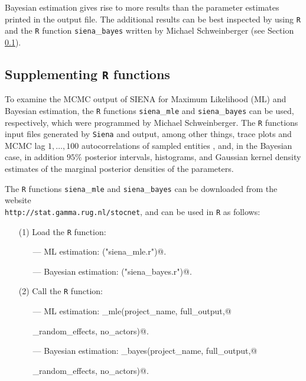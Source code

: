 \documentclass[a4paper,fleqn,11pt]{article}
\newcommand{\+}{\, + \,}
\newcommand{\SI}{{\sf SIENA }}
\begin{document}
Bayesian estimation gives rise to more results than the parameter
estimates printed in the output file.
The additional results can be best inspected by using {\tt R} and the
{\tt R} function {\tt siena}\_{\tt bayes} written by Michael
Schweinberger (see Section \ref{R_functions}).

\subsection{Supplementing {\tt R} functions}
\label{R_functions}

To examine the MCMC output of \SI for Maximum Likelihood (ML) and Bayesian estimation,
the {\tt R} functions {\tt siena}\_{\tt mle} and {\tt siena}\_{\tt bayes} can be used,
respectively,
which were programmed by Michael Schweinberger.
The {\tt R} functions input files generated by {\tt Siena} and output,
among other things,
trace plots and MCMC lag $1, \dots, 100$ autocorrelations of sampled entities
\citep[see][]{SchweinbergerSnijders07b, SchweinbergerSnijders07c},
and,
in the Bayesian case,
in addition $95\%$ posterior intervals, histograms, and Gaussian kernel density
estimates of the marginal posterior densities of the parameters.

The {\tt R} functions {\tt siena}\_{\tt mle} and {\tt siena}\_{\tt bayes}
can be downloaded from the website \\
{\tt http://stat.gamma.rug.nl/stocnet},
and can be used in {\tt R} as follows:

\begin{itemize}
\item[(1)] Load the {\tt R} function:
\begin{itemize}
\item[---] ML estimation: \verb@source("siena_mle.r")@.
\item[---] Bayesian estimation: \verb@source("siena_bayes.r")@.
\end{itemize}
\item[(2)] Call the {\tt R} function:
\begin{itemize}
\item[---] ML estimation: \verb@siena_mle(project_name, full_output,@

\verb@no_random_effects, no_actors)@.

\item[---] Bayesian estimation: \verb@siena_bayes(project_name, full_output,@

\verb@no_random_effects, no_actors)@.

\end{itemize}
\end{itemize}
\end{document}
